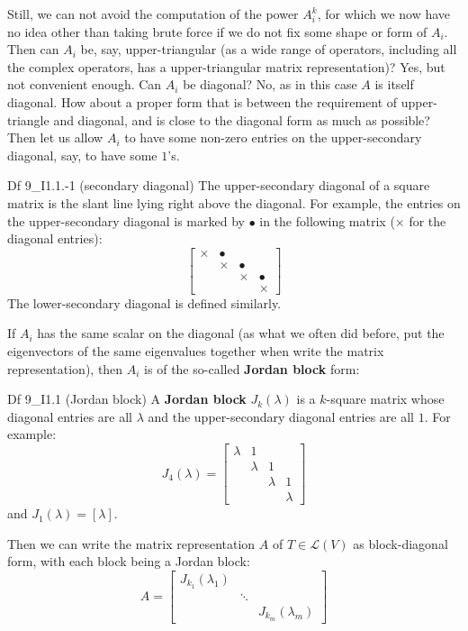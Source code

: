 \documentclass{article}
\begin{document}
Still, we can not avoid the computation of the power $A_i^k$, for which we now have no idea other than taking brute force if we do not fix some shape or form of $A_i$. Then can $A_i$ be, say, upper-triangular (as a wide range of operators, including all the complex operators, has a upper-triangular matrix representation)? Yes, but not convenient enough. Can $A_i$ be diagonal? No, as in this case $A$ is itself diagonal. How about a proper form that is between the requirement of upper-triangle and diagonal, and is close to the diagonal form as much as possible? Then let us allow $A_i$ to have some non-zero entries on the upper-secondary diagonal, say, to have some $1$'s.
\begin{Df}{Df 9\_I1.1.-1 (secondary diagonal)}
    The upper-secondary diagonal of a square matrix is the slant line lying right above the diagonal. For example, the entries on the upper-secondary diagonal is marked by $\bullet$ in the following matrix ($\times$ for the diagonal entries):
    $$
    \begin{bmatrix}
        \times & \bullet & & \\
        & \times & \bullet & \\
        & & \times & \bullet \\
        & & & \times
    \end{bmatrix}
    $$
    The lower-secondary diagonal is defined similarly.
\end{Df}

If $A_i$ has the same scalar on the diagonal (as what we often did before, put the eigenvectors of the same  eigenvalues together when write the matrix representation), then $A_i$ is of the so-called \textbf{Jordan block} form:

\begin{Df}{Df 9\_I1.1 (Jordan block)}
    A \textbf{Jordan block} $J_{k}(\lambda)$ is a $k$-square matrix whose diagonal entries are all $\lambda$ and the upper-secondary diagonal entries are all $1$. For example:
    $$ J_{4}(\lambda) =
    \begin{bmatrix}
        \lambda & 1 & & \\
        & \lambda & 1 & \\
        & & \lambda & 1 \\
        & & & \lambda
    \end{bmatrix}
    $$
    and $J_{1}(\lambda) = [\lambda]$.
\end{Df}

Then we can write the matrix representation $A$ of $T\in\mathcal{L}(V)$ as block-diagonal form, with each block being a Jordan block:
$$ A =
\begin{bmatrix}
    J_{k_1}(\lambda_1) & & \\
    & \ddots & \\
    & & J_{k_m}(\lambda_m)
\end{bmatrix}
$$
\end{document}
